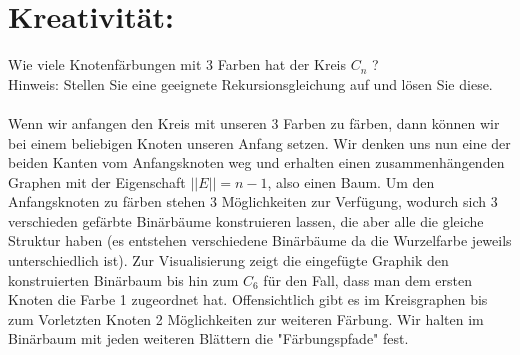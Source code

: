     \section*{Kreativität:} Wie viele Knotenfärbungen mit 3 Farben hat der Kreis $C_n$ ?\\
    Hinweis: Stellen Sie eine geeignete Rekursionsgleichung auf und lösen Sie diese.\\
    \\
    Wenn wir anfangen den Kreis mit unseren 3 Farben zu färben, dann können wir bei einem beliebigen Knoten unseren Anfang setzen. Wir denken uns nun eine der beiden Kanten vom Anfangsknoten weg und erhalten einen zusammenhängenden Graphen mit der Eigenschaft $||E|| = n-1$, also einen Baum. Um den Anfangsknoten zu färben stehen 3 Möglichkeiten zur Verfügung, wodurch sich 3 verschieden gefärbte Binärbäume konstruieren lassen, die aber alle die gleiche Struktur haben (es entstehen verschiedene Binärbäume da die Wurzelfarbe jeweils unterschiedlich ist). Zur Visualisierung zeigt die eingefügte Graphik den konstruierten Binärbaum bis hin zum $C_6$ für den Fall, dass man dem ersten Knoten die Farbe 1 zugeordnet hat. Offensichtlich gibt es im Kreisgraphen bis zum Vorletzten Knoten 2 Möglichkeiten zur weiteren Färbung. Wir halten im Binärbaum mit jeden weiteren Blättern die "Färbungspfade" fest. 
